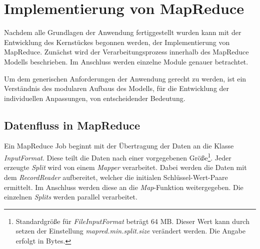 

\section{Implementierung von MapReduce}
Nachdem alle Grundlagen der Anwendung fertiggestellt wurden kann mit der Entwicklung des Kernstückes begonnen werden, der Implementierung von MapReduce. Zunächst wird der Verarbeitungsprozess innerhalb des MapReduce Modells beschrieben. Im Anschluss werden einzelne Module genauer betrachtet.

Um dem generischen Anforderungen der Anwendung gerecht zu werden, ist ein Verständnis des modularen Aufbaus des Modells, für die Entwicklung der individuellen Anpassungen, von entscheidender Bedeutung. 

\subsection{Datenfluss in MapReduce}
Ein MapReduce Job beginnt mit der Übertragung der Daten an die Klasse \textit{InputFormat}. Diese teilt die Daten nach einer vorgegebenen Größe\footnote{Standardgröße für \textit{FileInputFormat} beträgt 64 \ac{MB}. Dieser Wert kann durch setzen der Einstellung \textit{mapred.min.split.size} verändert werden. Die Angabe erfolgt in Bytes.}. Jeder erzeugte \textit{Split} wird von einem \textit{Mapper} verarbeitet. Dabei werden die Daten mit dem \textit{RecordReader} aufbereitet, welcher die initialen Schlüssel-Wert-Paare ermittelt. Im Anschluss werden diese an die \textit{Map}-Funktion weitergegeben. Die einzelnen \textit{Splits} werden parallel verarbeitet.


